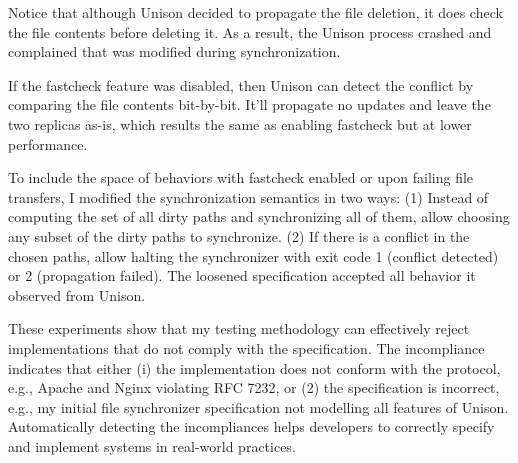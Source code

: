 Notice that although Unison decided to propagate the file deletion, it does
check the file contents before deleting it.  As a result, the Unison process
crashed and complained that  was modified during synchronization.

If the fastcheck feature was disabled, then Unison can detect the conflict by
comparing the file contents bit-by-bit.  It'll propagate no updates and leave
the two replicas as-is, which results the same as enabling fastcheck but at
lower performance.

To include the space of behaviors with fastcheck enabled or upon failing file
transfers, I modified the synchronization semantics in two ways: (1) Instead of
computing the set of all dirty paths and synchronizing all of them, allow
choosing any subset of the dirty paths to synchronize.  (2) If there is a
conflict in the chosen paths, allow halting the synchronizer with exit code 1
(conflict detected) or 2 (propagation failed).  The loosened specification
accepted all behavior it observed from Unison.

These experiments show that my testing methodology can effectively reject
implementations that do not comply with the specification.  The incompliance
indicates that either (i) the implementation does not conform with the protocol,
e.g., Apache and Nginx violating RFC 7232, or (2) the specification is
incorrect, e.g., my initial file synchronizer specification not modelling all
features of Unison.  Automatically detecting the incompliances helps developers
to correctly specify and implement systems in real-world practices.
